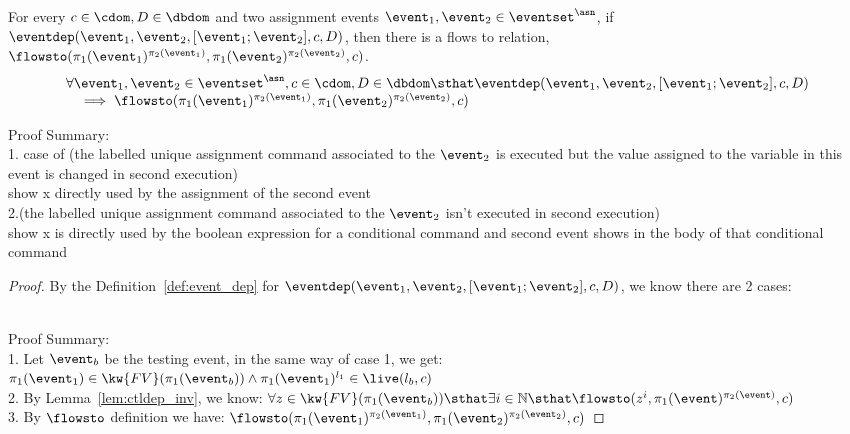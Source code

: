 \begin{lem}
	\label{lem:flowsto_soundness_emptytrace}
	For every $ c \in \cdom, D \in \dbdom$ and two assignment events $\event_1, \event_2 \in \eventset^{\asn}$,
	if $\eventdep(\event_1, \event_2, [\event_1; \event_2],  c, D) $,
	then there is a flows to relation, $\flowsto(\pi_1(\event_1)^{\pi_2(\event_1)}, \pi_1(\event_2)^{\pi_2(\event_2)}, c)$.
	\[
	\begin{array}{l}
		\forall \event_1, \event_2 \in \eventset^{\asn}, c \in \cdom, D \in \dbdom 
		\sthat  
		\eventdep(\event_1, \event_2, [\event_1; \event_2],  c, D) 
		\\ \quad 
		\implies 
		\flowsto(\pi_1(\event_1)^{\pi_2(\event_1)}, \pi_1(\event_2)^{\pi_2(\event_2)}, c)
	\end{array}
	\]
\end{lem}
Proof Summary:
\\
1. case of (the labelled unique assignment command associated to the $\event_2$ 
is executed but the value assigned to the variable in this event is changed in second execution)
\\
show x directly used by the assignment of the second event
\\
2.(the labelled unique assignment command associated to the $\event_2$ isn't executed in second execution)
\\
show x is directly used by the boolean expression for a conditional command and second event shows in the body of that conditional command 
%
\begin{proof}
	By the Definition~\ref{def:event_dep} for $\eventdep(\event_1, \event_2, [\event_1; \event_2], c, D)$, 
	we know there are 2 cases:

		\\
		Proof Summary:
		\\
		1. Let $\event_b$ be the testing event,
		in the same way of case 1, we get:
		 $\pi_1(\event_1) \in \kw{FV}(\pi_1(\event_b)) 
		 \land 
		\pi_1(\event_1)^{l_1} \in \live(l_b, c)$
		 \\
		 2. By Lemma~\ref{lem:ctldep_inv}, we know:
		   $\forall z \in \kw{FV}(\pi_1(\event_b)) \sthat  \exists i \in \mathbb{N} \sthat 
		 \flowsto(z^i, \pi_1(\event)^{\pi_2(\event)}, c)$
		 \\
		 3. By $\flowsto$ definition we have:
		   $\flowsto(\pi_1(\event_1)^{\pi_2(\event_1)}, \pi_1(\event_2)^{\pi_2(\event_2)}, c)$
		
\end{proof}
%


